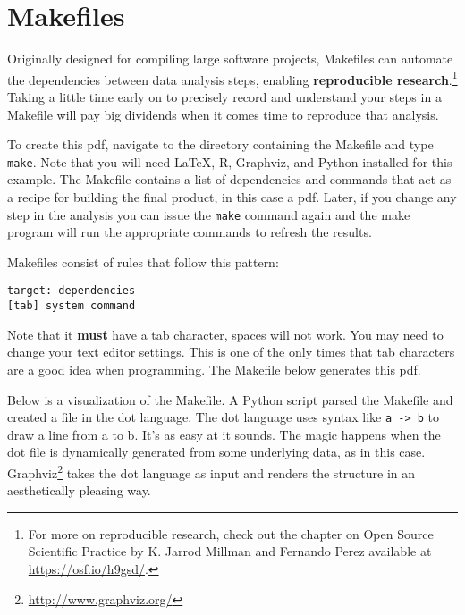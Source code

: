 \documentclass[11pt]{article}
\begin{document}
\section*{Makefiles}

Originally designed for compiling large software projects, Makefiles can automate the dependencies between data analysis steps, enabling \textbf{reproducible research}.\footnote{For more on reproducible research, check out the chapter on Open Source Scientific Practice by K. Jarrod Millman and Fernando Perez available at \url{https://osf.io/h9gsd/}.}
Taking a little time early on to precisely record and understand your steps in a Makefile will pay big dividends when it comes time to reproduce that analysis.

To create this pdf, navigate to the directory containing the Makefile and type {\tt make}. Note that you will need \LaTeX, R, Graphviz, and Python installed for this example. The Makefile contains a list of dependencies and commands that act as a recipe for building the final product, in this case a pdf. Later, if you change any step in the analysis you can issue the {\tt make} command again and the make program will run the appropriate commands to refresh the results.

Makefiles consist of rules that follow this pattern:

\begin{lstlisting}
target: dependencies
[tab] system command
\end{lstlisting}

Note that it \textbf{must} have a tab character, spaces will not work. You may need to change your text editor settings. This is one of the only times that tab characters are a good idea when programming. The Makefile below generates this pdf.

\vspace{0.3in}



\vspace{0.3in}

Below is a visualization of the Makefile. A Python script parsed the Makefile and created a file in the dot language. The dot language uses syntax like {\tt a -> b} to draw a line from a to b. It's as easy at it sounds. The magic happens when the dot file is dynamically generated from some underlying data, as in this case. Graphviz\footnote{\url{http://www.graphviz.org/}} takes the dot language as input and renders the structure in an aesthetically pleasing way.
\end{document}
